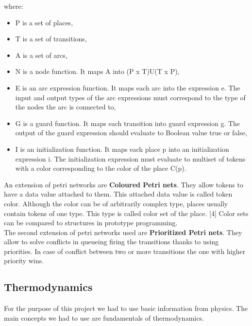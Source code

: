 \documentclass[a4paper]{article}
\begin{document}
where:
\begin{itemize}
	\setlength{\itemsep}{1pt}
	\setlength{\parskip}{0pt}
	\setlength{\parsep}{0pt}
\item P is a set of places,
\item T is a set of transitions,
\item A is a set of arcs,
\item N is a node function. It maps A into (P x T)U(T x P),
\item E is an arc expression function. It maps each arc into the expression e. The input and output types of the arc expressions must correspond to the type of the nodes the arc is connected to,
\item G is a guard function. It maps each transition into guard expression g. The output of the guard expression should evaluate to Boolean value true or false,
\item I is an initialization function. It maps each place p into an initialization expression i. The initialization expression must evaluate to multiset of tokens with a color corresponding to the color of the place C(p).\\
\end{itemize}

\clearpage

An extension of petri networks are \textbf{Coloured Petri nets}. They allow tokens to have a data value attached to them. This attached data value is called token color. Although the color can be of arbitrarily complex type, places usually contain tokens of one type. This type is called color set of the place. [4] Color sets can be compared to structures in prototype programming.\\

The second extension of petri networks used are \textbf{Prioritized Petri nets}. They allow to solve conflicts in queueing firing the transitions thanks to using priorities. In case of conflict between two or more transitions the one with higher priority wins.

\subsection{Thermodynamics}
\label{sec:thermodynamics}
\paragraph{}
For the purpose of this project we had to use basic information from physics. The main concepts we had to use are fundamentals of thermodynamics.\\
\end{document}
